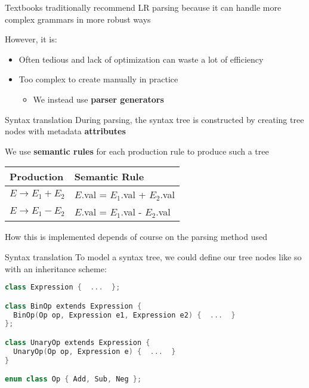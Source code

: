\documentclass[../index.tex]{subfiles}
\begin{document}
\begin{frame}[fragile]{\currenttitle}
  Textbooks traditionally recommend LR parsing because it can handle more
  complex grammars in more robust ways

  However, it is:

  \begin{itemize}
    \item<+-> Often tedious and lack of optimization can waste a lot of
      efficiency
    \item<+-> Too complex to create manually in practice
      \begin{itemize}
        \item We instead use \textbf{parser generators}
      \end{itemize}
  \end{itemize}

\end{frame}

\renewcommand{\sectiontitle}{Syntax translation}
\renewcommand{\currenttitle}{\sectiontitle}
\begin{frame}[fragile]{\currenttitle}
  During parsing, the syntax tree is constructed by creating tree nodes with
  metadata \textbf{attributes}

  We use \textbf{semantic rules} for each production rule to produce such a
  tree

  \begin{center}
    \begin{tabular}{l |l}
      Production                  & Semantic Rule                       \\
      \hline
      $E \rightarrow E_1 + E_2$   & $E$.val = $E_1$.val + $E_2$.val \\
      $E \rightarrow E_1 - E_2$   & $E$.val = $E_1$.val - $E_2$.val \\
    \end{tabular}
  \end{center}

  How this is implemented depends of course on the parsing method used
\end{frame}

\renewcommand{\currenttitle}{Syntax translation}
\begin{frame}[fragile]{\currenttitle}
  To model a syntax tree, we could define our tree nodes like so with an
  inheritance scheme:

  \begin{lstlisting}[language=C++]
class Expression {  ...  };

class BinOp extends Expression {
  BinOp(Op op, Expression e1, Expression e2) {  ...  }
};

class UnaryOp extends Expression {
  UnaryOp(Op op, Expression e) {  ...  }
}

enum class Op { Add, Sub, Neg };
  \end{lstlisting}
\end{frame}
\end{document}
